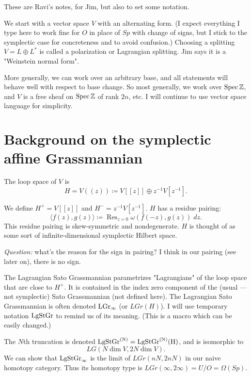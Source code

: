{\parskip=12pt %


These are Ravi's notes, for Jim, but also to set some notation.


We start with a vector space $\boxed{V}$ with an alternating form. 
(I expect everything I type here to work fine for $O$ in place of $Sp$  with change of signs, but I stick to the symplectic case for concreteness and to avoid confusion.) 
Choosing a splitting $V = L \oplus L^*$ is called a polarization or Lagrangian splitting. Jim says it is a "Weinstein normal form".

More generally, we can work over an arbitrary base, and all statements will behave well with respect to base change.
So most generally, we work over $\operatorname{Spec} \mathbb{Z}$, and $V$ is a free sheaf on $\operatorname{Spec} \mathbb{Z}$ of rank $2n$, etc.  I will continue to use vector space language for simplicity.


\section{Background on the symplectic affine Grassmannian}



The loop space of $V$ is
$$H = V((z)) \coloneq V[[z]] \oplus z^{-1} V[ z^{-1}].$$


We define
$H^+ = V[[z]]$ and $H^- = z^{-1} V[ z^{-1}]$.
$H$ has a residue pairing:  
$$\langle f(z), g(z) \rangle \coloneq \operatorname{Res}_{z=0}  \omega(f(-z), g(z)) \; dz.$$
This residue pairing is skew-symmetric and nondegenerate.
$H$ is thought of as some sort of infinite-dimensional symplectic Hilbert space.


{\em Question:} what's the reason for the sign in pairing?  
I think in our pairing (see later on), there is no sign.



The Lagrangian Sato Grassmannian parametrizes "Lagrangians" of the loop space that are close to $H^+$.
It is contained in the index zero component of the (usual --- not symplectic) Sato Grassmannian (not defined here).
The Lagrangian Sato Grassmannian  is often denoted $\rm{LGr}_\infty$ (or $LGr(H)$).  I will use temporary notation $\rm{LgStGr}$ to remind us of its meaning. (This is a macro which can be easily changed.)


The $N$th truncation is denoted $\rm{LgStGr}^{(N)} = \rm{LgStGr}^{(N)}(H)$, and is isomorphic to $$LG(N \dim V, 2N \dim V).$$
We can show that $\rm{LgStGr}_\infty$ is the limit of $LGr(nN, 2nN)$ in our naive homotopy category.   Thus its homotopy type is $LGr(\infty, 2 \infty) = U/O = \Omega(Sp)$.

}
